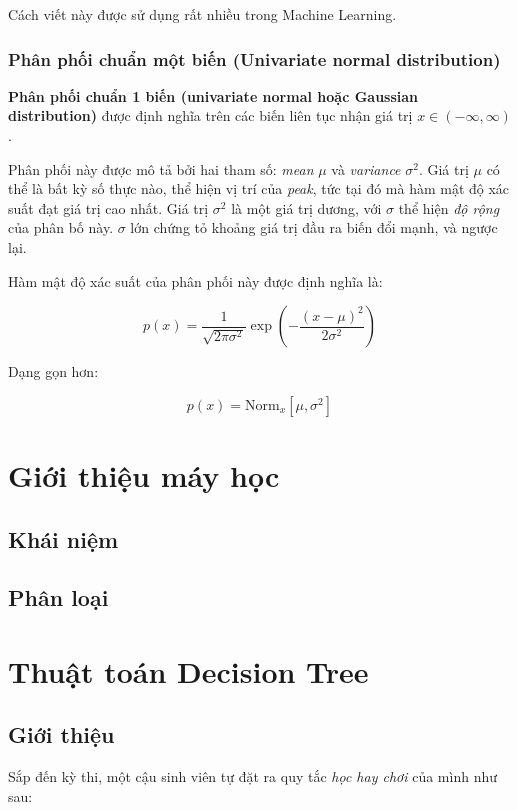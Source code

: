 \documentclass[../main-report.tex]{subfiles}
\begin{document}
Cách viết này được sử dụng rất nhiều trong Machine Learning.

\subsubsection*{Phân phối chuẩn một biến (Univariate normal distribution)}
\textbf{Phân phối chuẩn 1 biến (univariate normal hoặc Gaussian distribution)} được định nghĩa trên các biến liên tục nhận giá trị \(x \in (-\infty, \infty)\).

Phân phối này được mô tả bởi hai tham số: \emph{mean} \(\mu\) và \emph{variance} \(\sigma^2\). Giá trị \(\mu\) có thể là bất kỳ số thực nào, thể hiện vị trí của \emph{peak}, tức tại đó mà hàm mật độ xác suất đạt giá trị cao nhất. Giá trị \(\sigma^2\) là một giá trị dương, với \(\sigma\) thể hiện \emph{độ rộng} của phân bố này. \(\sigma\) lớn chứng tỏ khoảng giá trị đầu ra biến đổi mạnh, và ngược lại.

Hàm mật độ xác suất của phân phối này được định nghĩa là:

\begin{equation}
  p(x) = \frac{1}{\sqrt{2\pi \sigma^2}}\exp \left( -\frac{(x - \mu)^2}{2\sigma^2}\right)
\end{equation}

Dạng gọn hơn:

\begin{equation}
p(x) = \text{Norm}_x [\mu, \sigma^2]
\end{equation}

\section{Giới thiệu máy học}
\subsection{Khái niệm}

\subsection{Phân loại}

\section{Thuật toán Decision Tree}
\subsection{Giới thiệu}
Sắp đến kỳ thi, một cậu sinh viên tự đặt ra quy tắc \textit{học hay chơi} của mình như sau:
\end{document}
